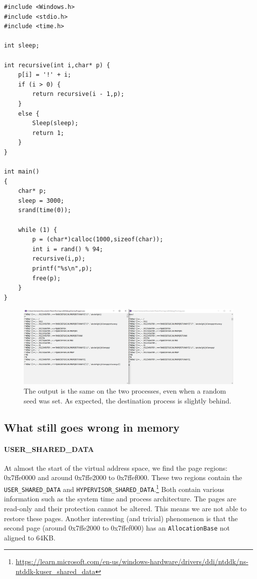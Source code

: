 \documentclass[a4paper, 11pt, english]{report}
\begin{document}
\begin{lstlisting}[label=lst:memory-verification,language={[Visual]C++},caption={The program to verify memory}]
#include <Windows.h>
#include <stdio.h>
#include <time.h>

int sleep;

int recursive(int i,char* p) {
	p[i] = '!' + i;
	if (i > 0) {
		return recursive(i - 1,p);
	}
	else {
		Sleep(sleep);
		return 1;
	}
}

int main()
{
	char* p;
	sleep = 3000;
	srand(time(0));

	while (1) {
		p = (char*)calloc(1000,sizeof(char));
		int i = rand() % 94;
		recursive(i,p);
		printf("%s\n",p);
		free(p);
	}
}
\end{lstlisting}

\begin{figure}[h]
\centerline{\includegraphics[width=1.2\textwidth]{images/memory-comparison-white.png}}
\label{fig:memory-comparison}
\caption{The output is the same on the two processes, even when a random seed was set. As expected, the destination process is slightly behind.}
\end{figure}

\subsection{What still goes wrong in memory}
\label{sec:memory-what-goes-wrong}

\paragraph{USER\_SHARED\_DATA}
\label{sec:user-shared-data}
At almost the start of the virtual address space, we find the page regions: 0x7ffe0000 and around 0x7ffe2000 to 0x7ffef000. These two regions contain the \texttt{USER\_SHARED\_DATA} and \texttt{HYPERVISOR\_SHARED\_DATA}.\footnote{\url{https://learn.microsoft.com/en-us/windows-hardware/drivers/ddi/ntddk/ns-ntddk-kuser\_shared_data}}
Both contain various information such as the system time and process architecture. The pages are read-only and their protection cannot be altered. This means we are not able to restore these pages. Another interesting (and trivial) phenomenon is that the second page (around 0x7ffe2000 to 0x7ffef000) has an \texttt{AllocationBase} not aligned to 64KB.
\end{document}
